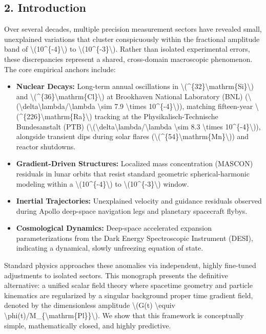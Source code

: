 \documentclass[
  10pt,
]{article}
\providecommand{\tightlist}{%
  \setlength{\itemsep}{0pt}\setlength{\parskip}{0pt}}
\begin{document}
\hypertarget{introduction}{%
\subsection{2. Introduction}\label{introduction}}

Over several decades, multiple precision measurement sectors have
revealed small, unexplained variations that cluster conspicuously within
the fractional amplitude band of
\textbackslash(10\^{}\{-4\}\textbackslash) to
\textbackslash(10\^{}\{-3\}\textbackslash). Rather than isolated
experimental errors, these discrepancies represent a shared,
cross-domain macroscopic phenomenon. The core empirical anchors include:

\begin{itemize}
\tightlist
\item
  \textbf{Nuclear Decays:} Long-term annual oscillations in
  \textbackslash(\^{}\{32\}\textbackslash mathrm\{Si\}\textbackslash)
  and
  \textbackslash(\^{}\{36\}\textbackslash mathrm\{Cl\}\textbackslash) at
  Brookhaven National Laboratory (BNL)
  (\textbackslash(\textbackslash delta\textbackslash lambda/\textbackslash lambda
  \textbackslash sim 7.9 \textbackslash times
  10\^{}\{-4\}\textbackslash)), matching fifteen-year
  \textbackslash(\^{}\{226\}\textbackslash mathrm\{Ra\}\textbackslash)
  tracking at the Physikalisch-Technische Bundesanstalt (PTB)
  (\textbackslash(\textbackslash delta\textbackslash lambda/\textbackslash lambda
  \textbackslash sim 8.3 \textbackslash times
  10\^{}\{-4\}\textbackslash)), alongside transient dips during solar
  flares
  (\textbackslash(\^{}\{54\}\textbackslash mathrm\{Mn\}\textbackslash))
  and reactor shutdowns.
\item
  \textbf{Gradient-Driven Structures:} Localized mass concentration
  (MASCON) residuals in lunar orbits that resist standard geometric
  spherical-harmonic modeling within a
  \textbackslash(10\^{}\{-4\}\textbackslash) to
  \textbackslash(10\^{}\{-3\}\textbackslash) window.
\item
  \textbf{Inertial Trajectories:} Unexplained velocity and guidance
  residuals observed during Apollo deep-space navigation legs and
  planetary spacecraft flybys.
\item
  \textbf{Cosmological Dynamics:} Deep-space accelerated expansion
  parameterizations from the Dark Energy Spectroscopic Instrument
  (DESI), indicating a dynamical, slowly unfreezing equation of state.
\end{itemize}

Standard physics approaches these anomalies via independent, highly
fine-tuned adjustments to isolated sectors. This monograph presents the
definitive alternative: a unified scalar field theory where spacetime
geometry and particle kinematics are regularized by a singular
background proper time gradient field, denoted by the dimensionless
amplitude \textbackslash(G(t) \textbackslash equiv
\textbackslash phi(t)/M\_\{\textbackslash mathrm\{Pl\}\}\textbackslash).
We show that this framework is conceptually simple, mathematically
closed, and highly predictive.
\end{document}
